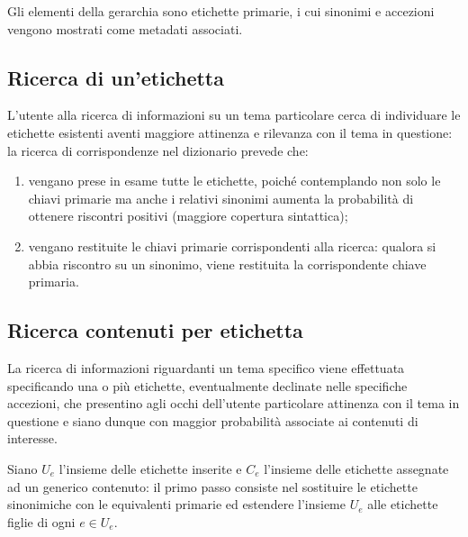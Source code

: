 \documentclass[10pt,a4paper,headinclude,footinclude,hidelinks]{scrreprt} %
\begin{document}
	Gli elementi della gerarchia sono etichette primarie, i cui sinonimi e accezioni vengono mostrati come metadati associati. 
	\subsection{Ricerca di un'etichetta}
	L'utente alla ricerca di informazioni su un tema particolare cerca di individuare le etichette esistenti aventi maggiore attinenza e rilevanza con il tema in questione: la ricerca di corrispondenze nel dizionario prevede che:
	\begin{enumerate}
	\item vengano prese in esame tutte le etichette, poiché contemplando non solo le chiavi primarie ma anche i relativi sinonimi aumenta la probabilità di ottenere riscontri positivi (maggiore copertura sintattica);
	\item vengano restituite le chiavi primarie corrispondenti alla ricerca: qualora si abbia riscontro su un sinonimo, viene restituita la corrispondente chiave primaria.
	\end{enumerate}

	\subsection{Ricerca contenuti per etichetta}
	La ricerca di informazioni riguardanti un tema specifico viene effettuata specificando una o più etichette, eventualmente declinate nelle specifiche accezioni, che presentino agli occhi dell'utente particolare attinenza con il tema in questione e siano dunque con maggior probabilità associate ai contenuti di interesse.

	Siano $U_e$ l'insieme delle etichette inserite e $C_e$ l'insieme delle etichette assegnate ad un generico contenuto: il primo passo consiste nel sostituire le etichette sinonimiche con le equivalenti primarie ed estendere l'insieme $U_e$ alle etichette figlie di ogni $e \in U_e$.
\end{document}
